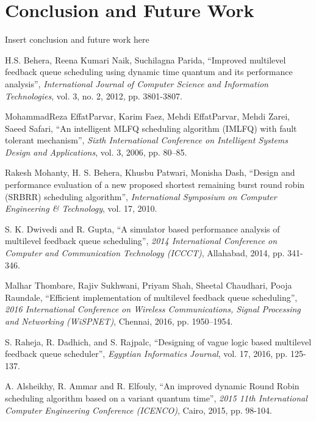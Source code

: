 \documentclass[conference]{IEEEtran}
\begin{document}
\section{Conclusion and Future Work}

Insert conclusion and future work here


\begin{thebibliography}{00}

 H.S. Behera, Reena Kumari Naik, Suchilagna Parida, ``Improved multilevel feedback queue scheduling using dynamic time quantum and its performance analysis'', \textit{International Journal of Computer Science and Information Technologies}, vol. 3, no. 2, 2012, pp. 3801-3807.

 MohammadReza EffatParvar, Karim Faez, Mehdi EffatParvar, Mehdi Zarei, Saeed Safari, ``An intelligent MLFQ scheduling algorithm (IMLFQ) with fault tolerant mechanism'', \textit{Sixth International Conference on Intelligent Systems Design and Applications}, vol. 3, 2006, pp. 80–85.

 Rakesh Mohanty, H. S. Behera, Khusbu Patwari, Monisha Dash, ``Design and performance evaluation of a new proposed shortest remaining burst round robin (SRBRR) scheduling algorithm'', \textit{International Symposium on Computer Engineering \& Technology}, vol. 17, 2010.

 S. K. Dwivedi and R. Gupta, ``A simulator based performance analysis of multilevel feedback queue scheduling'', \textit{2014 International Conference on Computer and Communication Technology (ICCCT)}, Allahabad, 2014, pp. 341-346.

 Malhar Thombare, Rajiv Sukhwani, Priyam Shah, Sheetal Chaudhari, Pooja Raundale, ``Efficient implementation of multilevel feedback queue scheduling'', \textit{2016 International Conference on Wireless Communications, Signal Processing and Networking (WiSPNET)}, Chennai, 2016, pp. 1950–1954.

 S. Raheja, R. Dadhich, and S. Rajpalc, ``Designing of vague logic based multilevel feedback queue scheduler'', \textit{Egyptian Informatics Journal}, vol. 17, 2016, pp. 125-137.

 A. Alsheikhy, R. Ammar and R. Elfouly, ``An improved dynamic Round Robin scheduling algorithm based on a variant quantum time'', \textit{2015 11th International Computer Engineering Conference (ICENCO)}, Cairo, 2015, pp. 98-104.


\end{thebibliography}
\end{document}
